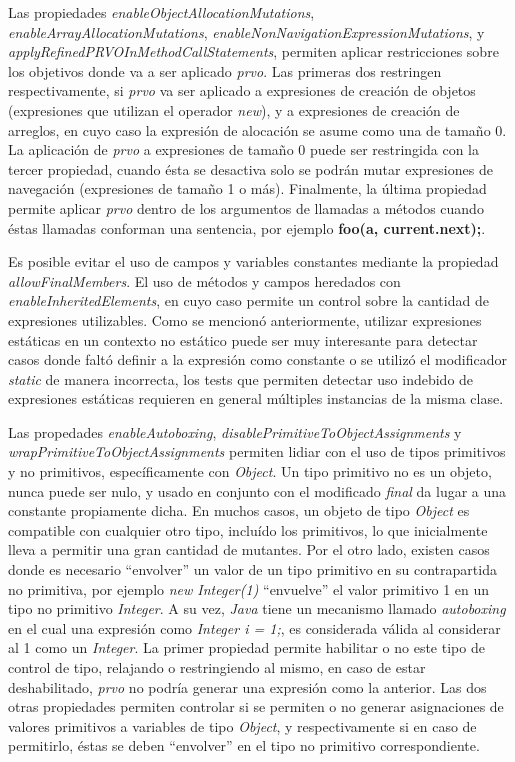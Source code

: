 Las propiedades \emph{enableObjectAllocationMutations}, \emph{enableArrayAllocationMutations}, \emph{enableNonNavigationExpressionMutations}, y \emph{applyRefinedPRVOInMethodCallStatements}, permiten aplicar restricciones sobre los objetivos donde va a ser aplicado \emph{prvo}. Las primeras dos restringen respectivamente, si \emph{prvo} va ser aplicado a expresiones de creaci\'on de objetos (expresiones que utilizan el operador \emph{new}), y a expresiones de creaci\'on de arreglos, en cuyo caso la expresi\'on de alocaci\'on se asume como una de tama\~no 0. La aplicaci\'on de \emph{prvo} a expresiones de tama\~no 0 puede ser restringida con la tercer propiedad, cuando \'esta se desactiva solo se podr\'an mutar expresiones de navegaci\'on (expresiones de tama\~no 1 o m\'as). Finalmente, la \'ultima propiedad permite aplicar \emph{prvo} dentro de los argumentos de llamadas a m\'etodos cuando \'estas llamadas conforman una sentencia, por ejemplo \textbf{foo(a, current.next);}.

Es posible evitar el uso de campos y variables constantes mediante la propiedad \emph{allowFinalMembers}. El uso de m\'etodos y campos heredados con \emph{enableInheritedElements}, en cuyo caso permite un control sobre la cantidad de expresiones utilizables. Como se mencion\'o anteriormente, utilizar expresiones est\'aticas en un contexto no est\'atico puede ser muy interesante para detectar casos donde falt\'o definir a la expresi\'on como constante o se utiliz\'o el modificador \emph{static} de manera incorrecta, los tests que permiten detectar uso indebido de expresiones est\'aticas requieren en general m\'ultiples instancias de la misma clase.

Las propedades \emph{enableAutoboxing}, \emph{disablePrimitiveToObjectAssignments} y \emph{wrapPrimitiveToObjectAssignments} permiten lidiar con el uso de tipos primitivos y no primitivos, espec\'ificamente con \emph{Object}. Un tipo primitivo no es un objeto, nunca puede ser nulo, y usado en conjunto con el modificado \emph{final} da lugar a una constante propiamente dicha. En muchos casos, un objeto de tipo \emph{Object} es compatible con cualquier otro tipo, inclu\'ido los primitivos, lo que inicialmente lleva a permitir una gran cantidad de mutantes. Por el otro lado, existen casos donde es necesario ``envolver'' un valor de un tipo primitivo en su contrapartida no primitiva, por ejemplo \emph{new Integer(1)} ``envuelve'' el valor primitivo 1 en un tipo no primitivo \emph{Integer}. A su vez, \emph{Java} tiene un mecanismo llamado \emph{autoboxing} en el cual una expresi\'on como \emph{Integer i = 1;}, es considerada v\'alida al considerar al 1 como un \emph{Integer}. La primer propiedad permite habilitar o no este tipo de control de tipo, relajando o restringiendo al mismo, en caso de estar deshabilitado, \emph{prvo} no podr\'ia generar una expresi\'on como la anterior. Las dos otras propiedades permiten controlar si se permiten o no generar asignaciones de valores primitivos a variables de tipo \emph{Object}, y respectivamente si en caso de permitirlo, \'estas se deben ``envolver'' en el tipo no primitivo correspondiente.

